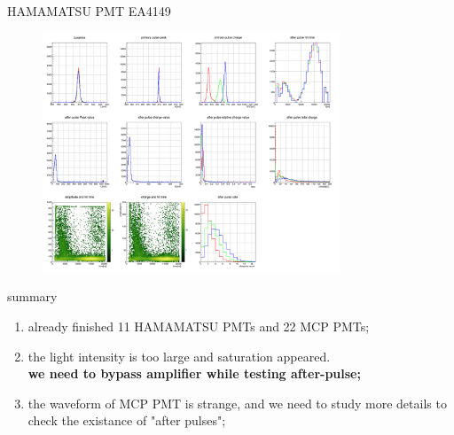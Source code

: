 \documentclass[11pt,compress,xcolor=x11names,UTF8]{beamer}
\begin{document}
\begin{frame}{HAMAMATSU PMT EA4149}
\vspace{-.4cm}
\begin{figure}
\centering
	\includegraphics[width=0.79\textwidth]{figure/EA4149_apstats}
\end{figure}

\end{frame}
\begin{frame}{summary}
	\begin{enumerate}
	\item  already finished 11 HAMAMATSU PMTs and 22 MCP PMTs;
	\item the light intensity is too large and saturation appeared.\\ \textbf{we need to bypass amplifier while testing after-pulse;}
	\item the waveform of MCP PMT is strange, and we need to study more details to check the existance of "after pulses";
	\end{enumerate}
\end{frame}
\end{document}
